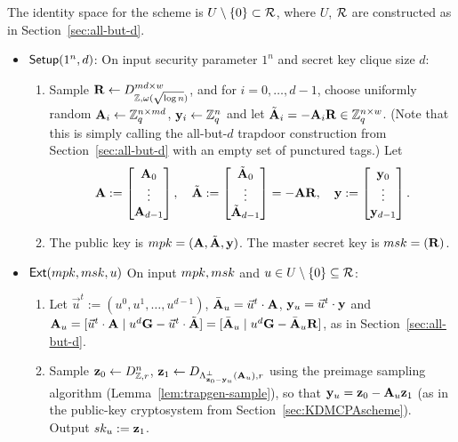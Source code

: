The identity space for the scheme is $U\setminus \{{0}\} \subset
\mathcal{R}$, where $U$, $\mathcal{R}$ are constructed as in
Section~\ref{sec:all-but-d}.
\begin{itemize}
\item$\mathsf{Setup}(1^n, d)$: On input security parameter $1^n$ and secret
  key clique size $d$:
  \begin{enumerate}
  \item Sample $\mathbf{R} \gets D_{\mathbb{Z}, \omega(\sqrt{\log{n}})}^{m{d}\times
      w}$, and for $i=0, \ldots, d-1$, choose uniformly random
    $\mathbf{A}_i \gets \mathbb{Z}_q^{n \times md}$, $\mathbf{y}_i \gets \mathbb{Z}_q^{n}$ and let
    $\tilde{\mathbf{A}}_i=-\mathbf{A}_i\mathbf{R} \in \mathbb{Z}_q^{n \times w}$.  (Note that this is
    simply calling the all-but-$d$ trapdoor construction from
    Section~\ref{sec:all-but-d} with an empty set of punctured tags.)
    Let \[ \mathbf{A}
    := \begin{bmatrix}\mathbf{A}_0\\\vdots\\\mathbf{A}_{d-1}\end{bmatrix}, \quad
    \tilde{\mathbf{A}}
    := \begin{bmatrix}\tilde{\mathbf{A}}_0\\\vdots\\\tilde{\mathbf{A}}_{d-1}\end{bmatrix} =
    -\mathbf{A} \mathbf{R}, \quad \mathbf{y}
    := \begin{bmatrix}\mathbf{y}_0\\\vdots\\\mathbf{y}_{d-1}\end{bmatrix}. \]
  \item The public key is $mpk=(\mathbf{A}, \tilde{\mathbf{A}}, \mathbf{y})$. The master
    secret key is $msk=(\mathbf{R})$.
  \end{enumerate}

\item $\mathsf{Ext}(mpk, msk, u)$ On input $mpk, msk$ and $u \in U
  \setminus \{0\} \subseteq \mathcal{R}$:
  \begin{enumerate}
  \item Let $\vec{u}^t := (u^0, u^1, \ldots, u^{d-1})$, $\bar{\mathbf{A}}_{u} =
    \vec{u}^t \cdot \mathbf{A}$, $\mathbf{y}_{u} = \vec{u}^t \cdot \mathbf{y}$ and
    $\mathbf{A}_{u} = [\vec{u}^{t} \cdot \mathbf{A} \mid u^{d}\mathbf{G} - 
    \vec{u}^{t}\cdot \tilde{\mathbf{A}}] = 
    [\bar{\mathbf{A}}_{u} \mid u^d\mathbf{G}-\bar{\mathbf{A}}_{u}\mathbf{R}]$, as in
    Section~\ref{sec:all-but-d}.
  \item Sample $\mathbf{z}_{0} \gets D_{\mathbb{Z},r}^{n}$, $\mathbf{z}_{1} \gets
    D_{\Lambda_{\mathbf{z}_{0}-\mathbf{y}_{u}}^{\perp}(\mathbf{A}_{u}), r}$ using the
    preimage sampling algorithm (Lemma~\ref{lem:trapgen-sample}), so
    that $\mathbf{y}_{u} = \mathbf{z}_{0}-\mathbf{A}_{u} \mathbf{z}_{1}$ (as in the
    public-key cryptosystem from Section~\ref{sec:KDMCPAscheme}).
    Output $sk_{u} := \mathbf{z}_{1}$.
    

\end{enumerate}
\end{itemize}
